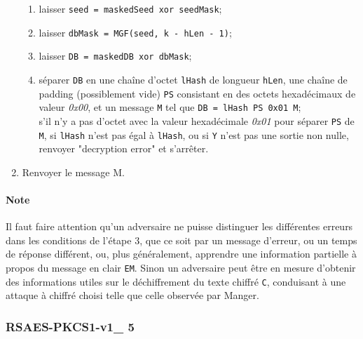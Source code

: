 \begin{enumerate}
\begin{enumerate}
       \item laisser \texttt{seed = maskedSeed xor seedMask};
       \item laisser \texttt{dbMask = MGF(seed, k - hLen - 1)};
       \item laisser \texttt{DB = maskedDB xor dbMask};
       \item séparer \texttt{DB} en une chaîne d'octet \texttt{lHash} de longueur \texttt{hLen}, une chaîne de padding (possiblement vide) \texttt{PS} consistant en des octets hexadécimaux de valeur \textit{0x00}, et un message \texttt{M} tel que \texttt{DB = lHash \textbar\textbar PS \textbar\textbar 0x01 \textbar\textbar M};
\\ s'il n'y a pas d'octet avec la valeur hexadécimale \textit{0x01} pour séparer \texttt{PS} de \texttt{M}, si \texttt{lHash} n'est pas égal à \texttt{lHash}, ou si \texttt{Y} n'est pas une sortie non nulle, renvoyer "decryption error" et s'arrêter.\\
\end{enumerate}
\item Renvoyer le message M.\\
\end{enumerate}
\paragraph{Note} Il faut faire attention qu'un adversaire ne puisse distinguer les différentes erreurs dans les conditions de l'étape 3, que ce soit par un message d'erreur, ou un temps de réponse différent, ou, plus généralement, apprendre une information partielle à propos du message en clair \texttt{EM}. Sinon un adversaire peut être en mesure d'obtenir des informations utiles sur le déchiffrement du texte chiffré \texttt{C}, conduisant à une attaque à chiffré choisi telle que celle observée par Manger.
   
\subsubsection{RSAES-PKCS1-v1\_ 5}

